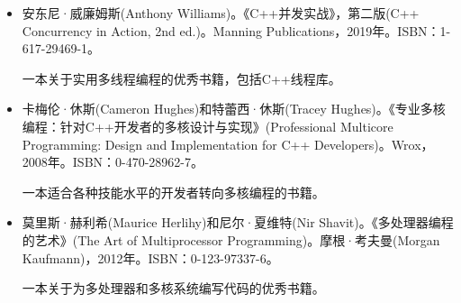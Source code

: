 

\begin{itemize}
\item
安东尼·威廉姆斯(Anthony Williams)。《C++并发实战》，第二版(C++ Concurrency in Action, 2nd ed.)。Manning Publications，2019年。ISBN：1-617-29469-1。

\hspace*{\fill}

一本关于实用多线程编程的优秀书籍，包括C++线程库。

\hspace*{\fill}

\item
卡梅伦·休斯(Cameron Hughes)和特蕾西·休斯(Tracey Hughes)。《专业多核编程：针对C++开发者的多核设计与实现》(Professional Multicore Programming: Design and Implementation for C++ Developers)。Wrox，2008年。ISBN：0-470-28962-7。

\hspace*{\fill}

一本适合各种技能水平的开发者转向多核编程的书籍。

\hspace*{\fill}

\item
莫里斯·赫利希(Maurice Herlihy)和尼尔·夏维特(Nir Shavit)。《多处理器编程的艺术》(The Art of Multiprocessor Programming)。摩根·考夫曼(Morgan Kaufmann)，2012年。ISBN：0-123-97337-6。

\hspace*{\fill}

一本关于为多处理器和多核系统编写代码的优秀书籍。
\end{itemize}